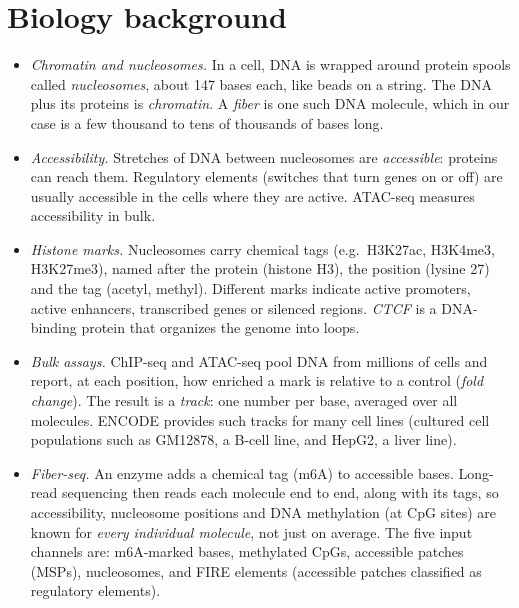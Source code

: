 \documentclass[acmtog,nonacm]{acmart}   %
\begin{document}



\appendix
\section{Biology background}
\label{app:bio}
\begin{itemize}
  \item \emph{Chromatin and nucleosomes.} In a cell, DNA is wrapped around protein spools called \emph{nucleosomes}, about 147 bases each, like beads on a string. The DNA plus its proteins is \emph{chromatin}. A \emph{fiber} is one such DNA molecule, which in our case is a few thousand to tens of thousands of bases long.
  \item \emph{Accessibility.} Stretches of DNA between nucleosomes are \emph{accessible}: proteins can reach them. Regulatory elements (switches that turn genes on or off) are usually accessible in the cells where they are active. ATAC-seq measures accessibility in bulk.
  \item \emph{Histone marks.} Nucleosomes carry chemical tags (e.g.\ H3K27ac, H3K4me3, H3K27me3), named after the protein (histone H3), the position (lysine 27) and the tag (acetyl, methyl). Different marks indicate active promoters, active enhancers, transcribed genes or silenced regions. \emph{CTCF} is a DNA-binding protein that organizes the genome into loops.
  \item \emph{Bulk assays.} ChIP-seq and ATAC-seq pool DNA from millions of cells and report, at each position, how enriched a mark is relative to a control (\emph{fold change}). The result is a \emph{track}: one number per base, averaged over all molecules. ENCODE provides such tracks for many cell lines (cultured cell populations such as GM12878, a B-cell line, and HepG2, a liver line).
  \item \emph{Fiber-seq.} An enzyme adds a chemical tag (m6A) to accessible bases. Long-read sequencing then reads each molecule end to end, along with its tags, so accessibility, nucleosome positions and DNA methylation (at CpG sites) are known for \emph{every individual molecule}, not just on average. The five input channels are: m6A-marked bases, methylated CpGs, accessible patches (MSPs), nucleosomes, and FIRE elements (accessible patches classified as regulatory elements).
\end{itemize}
\end{document}
